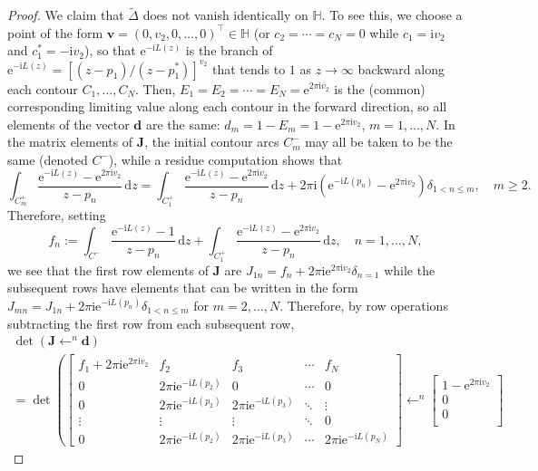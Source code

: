 \documentclass[10pt,a4paper]{amsart}
\newcommand{\dd}{\mathrm{d}}
\newcommand{\ee}{\mathrm{e}}
\newcommand{\ii}{\mathrm{i}}
\begin{document}
\begin{proof}
    We claim that $\widetilde{\Delta}$ does not vanish identically on $\mathbb{H}$.  To see this, we choose a point of the form $\mathbf{v}=(0,v_2,0,\dots,0)^\top\in\mathbb{H}$ (or $c_2=\cdots=c_N=0$ while $c_1=\ii v_2$ and $c_1^*=-\ii v_2$), so that $\ee^{-\ii L(z)}$ is the branch of $\ee^{-\ii L(z)}=[(z-p_1)/(z-p_1^*)]^{v_2}$ that tends to $1$ as $z\to\infty$ backward along each contour $C_1,\dots,C_N$. Then, $E_1=E_2=\cdots=E_N=\ee^{2\pi\ii v_2}$ is the (common) corresponding limiting value along each contour in the forward direction, so all elements of the vector $\mathbf{d}$ are the same:  $d_m=1-E_m=1-\ee^{2\pi\ii v_2}$, $m=1,\dots,N$.  In the matrix elements of $\mathbf{J}$, the initial contour arcs $C_m^-$ may all be taken to be the same (denoted $C^-$), while a residue computation shows that
    \begin{equation}
        \int_{C_m^+}\frac{\ee^{-\ii L(z)}-\ee^{2\pi\ii v_2}}{z-p_n}\,\dd z = \int_{C_1^+}\frac{\ee^{-\ii L(z)}-\ee^{2\pi\ii v_2}}{z-p_n}\,\dd z + 2\pi\ii (\ee^{-\ii L(p_n)}-\ee^{2\pi\ii v_2})\delta_{1<n\le m},\quad m\ge 2.
    \end{equation}
    Therefore, setting 
    \begin{equation}
        f_n:=\int_{C^-}\frac{\ee^{-\ii L(z)}-1}{z-p_n}\,\dd z +\int_{C_1^+}\frac{\ee^{-\ii L(z)}-\ee^{2\pi\ii v_2}}{z-p_n}\,\dd z,\quad n=1,\dots,N,
    \end{equation}
    we see that the first row elements of $\mathbf{J}$ are
    $J_{1n}=f_n+2\pi\ii\ee^{2\pi\ii v_2}\delta_{n=1}$ while the subsequent rows have elements that can be written in the form $J_{mn}=J_{1n}+2\pi\ii\ee^{-\ii L(p_n)}\delta_{1<n\le m}$ for $m=2,\dots,N$.  Therefore, by row operations subtracting the first row from each subsequent row,
    \begin{multline}
        \det(\mathbf{J}\mathop{\longleftarrow}^n\mathbf{d}) \\= 
        \det\left(\begin{bmatrix}f_1+2\pi\ii\ee^{2\pi\ii v_2} & f_2 & f_3 & 
        \cdots & f_N\\        
        0 & 2\pi\ii\ee^{-\ii L(p_2)} & 0 & 
        \cdots & 0\\        
        0 & 2\pi\ii\ee^{-\ii L(p_2)} & 2\pi\ii\ee^{-\ii L(p_3)} & 
        \ddots & \vdots\\           
        \vdots & \vdots & \vdots &
        \ddots & 0\\        
        0 & 2\pi\ii\ee^{-\ii L(p_2)}& 2\pi\ii\ee^{-\ii L(p_3)} & 
        \cdots &2\pi\ii \ee^{-\ii L(p_N)}\end{bmatrix}\mathop{\longleftarrow}^n\begin{bmatrix}1-\ee^{2\pi\ii v_2} \\0\\0\\

\end{bmatrix}
\end{multline}
\end{proof}
\end{document}
